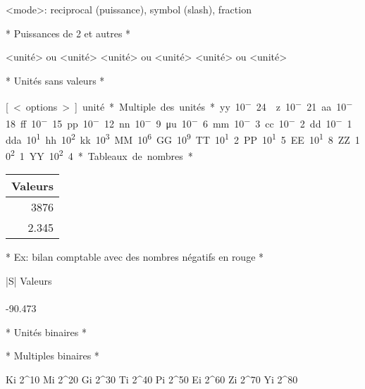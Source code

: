 <mode>: reciprocal (puissance), symbol (slash), fraction

* Puissances de 2 et autres *


\square<unité> ou <unité>\squared
\cubic<unité> ou <unité>\cubed
{}<unité> ou <unité>

* Unités sans valeurs *

\si[<options>]{unité}

* Multiple des unités *

\yocto y 10^-24
\zeptoz z 10^-21
\atto a 10^-18
\femto f 10^-15
\pico p 10^-12
\nano n 10^-9
\micro u 10^-6
\milli m 10^-3
\centi c 10^-2
\deci d 10^-1

\deca da 10^1
\hecto h 10^2
\kilo k 10^3
\mega M 10^6
\giga G 10^9
\tera T 10^12
\peta P 10^15
\exa E 10^18
\zetta Z 10^21
\yotta Y 10^24

* Tableaux de nombres *

\begin{tabular}{|r|} %
	\hline
	{Valeurs} \\ %
	\hline
	3876 \\
	2.345 \\
	\hline
\end{tabular}

* Ex: bilan comptable avec des nombres négatifs en rouge *


\usepackage{siunitx}
\begin{tabular}{|S|}
	\hline
	{Valeurs} \\
	 \\
	-90.473 \\
	\hline
\end{tabular}

* Unités binaires *

\usepackage[binary-units]{siunitx}

\bit \byte

* Multiples binaires *


\kibi Ki 2^10
\mebi Mi 2^20
\gibi Gi 2^30
\tebi Ti 2^40
\pebi Pi 2^50
\exbi Ei 2^60
\zebi Zi 2^70
\yobi Yi 2^80

